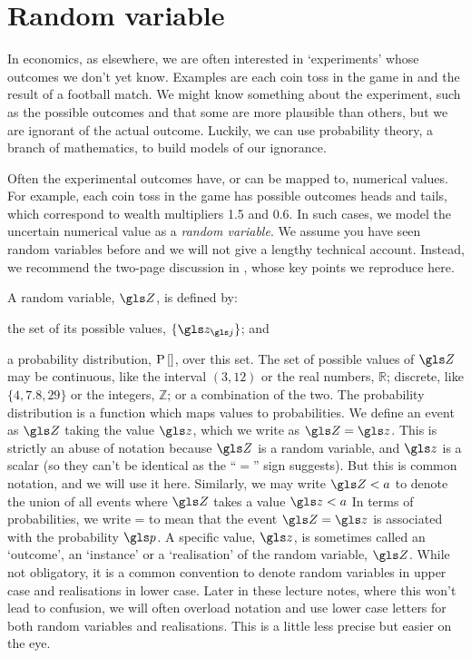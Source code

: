 \section{Random variable}
In economics, as elsewhere, we are often interested in `experiments' whose outcomes we don't yet know. Examples are each coin toss in the game in  and the result of a football match. We might know something about the experiment, such as the possible outcomes and that some are more plausible than others, but we are ignorant of the actual outcome. Luckily, we can use probability theory, a branch of mathematics, to build models of our ignorance.

Often the experimental outcomes have, or can be mapped to, numerical values. For example, each coin toss in the game has possible outcomes heads and tails, which correspond to wealth multipliers 1.5 and 0.6. In such cases, we model the uncertain numerical value as a \textit{random variable}. We assume you have seen random variables before and we will not give a lengthy technical account. Instead, we recommend the two-page discussion in \cite[p.~2]{vanKampen1992}, whose key points we reproduce here.

A random variable, $\Z$, is defined by:
\bi
\item the set of its possible values, $\{\z_\gj\}$; and
\item a probability distribution, $\mathrm{P}\left[\right]$, over this set.
\ei
The set of possible values of $\Z$ may be continuous, like the interval $(3,12)$ or the real numbers, 
$\mathbb{R}$; discrete, like $\{4, 7.8, 29\}$ or the integers, $\mathbb{Z}$; or a combination 
of the two. The probability distribution is a function which maps values to probabilities. We define an 
event as $\Z$ taking the value $\z$, which we write as $\Z=\z$. This is strictly an abuse
of notation because $\Z$ is a random variable, and $\z$ is a scalar (so they can't be identical as 
the ``$=$'' sign suggests). But this is common notation, and we will use it here. Similarly, we may write $\Z<a$
to denote the union of all events where $\Z$ takes a value $\z<a$ \etc
In terms of probabilities, we write
\be
\prob{\Z=\z}=\p
\ee
to mean that the event $\Z=\z$ is associated with the probability $\p$. A specific value, $\z$, 
is sometimes called an `outcome', an `instance' or a `realisation' of the random variable, $\Z$. 
While not obligatory, it is a common convention to denote random variables in upper case and 
realisations in lower case. Later in these lecture notes, where this won't lead to confusion, we will 
often overload notation and use lower case letters for both random variables and realisations. 
This is a little less precise but easier on the eye. 

